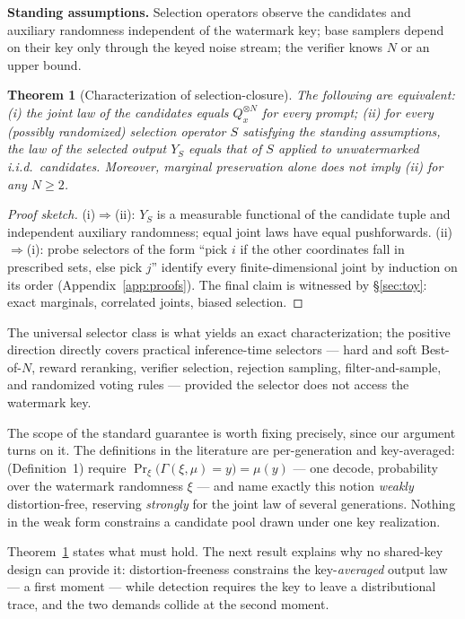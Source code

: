 \documentclass{article} %
\newtheorem{theorem}{Theorem}
\begin{document}
\textbf{Standing assumptions.} Selection operators observe the candidates and
auxiliary randomness independent of the watermark key; base samplers depend on
their key only through the keyed noise stream; the verifier knows $N$ or an
upper bound.

\begin{theorem}[Characterization of selection-closure]\label{thm:closure}
The following are equivalent:
(i) the joint law of the candidates equals $Q_x^{\otimes N}$ for every prompt;
(ii) for \emph{every} (possibly randomized) selection operator $S$ satisfying
the standing assumptions, the law of the selected output $Y_S$ equals that of
$S$ applied to unwatermarked i.i.d.\ candidates.
Moreover, marginal preservation alone does not imply (ii) for any $N\ge2$.
\end{theorem}
\begin{proof}[Proof sketch]
(i)$\Rightarrow$(ii): $Y_S$ is a measurable functional of the candidate tuple
and independent auxiliary randomness; equal joint laws have equal pushforwards.
(ii)$\Rightarrow$(i): probe selectors of the form ``pick $i$ if the other
coordinates fall in prescribed sets, else pick $j$'' identify every
finite-dimensional joint by induction on its order (Appendix~\ref{app:proofs}).
The final claim is witnessed by \S\ref{sec:toy}: exact marginals, correlated
joints, biased selection.
\end{proof}

The universal selector class is what yields an exact characterization; the
positive direction directly covers practical inference-time selectors ---
hard and soft Best-of-$N$, reward reranking, verifier selection, rejection
sampling, filter-and-sample, and randomized voting rules --- provided the
selector does not access the watermark key.

The scope of the standard guarantee is worth fixing precisely, since our
argument turns on it. The definitions in the literature are per-generation
and key-averaged: \citet{kuditipudi2023robust} (Definition~1) require
$\Pr_\xi\big(\Gamma(\xi,\mu)=y\big)=\mu(y)$ --- one decode,
probability over the watermark randomness $\xi$ --- and
\citet{keycollision2024} name exactly this notion \emph{weakly}
distortion-free, reserving \emph{strongly} for the joint law of several
generations. Nothing in the weak form constrains a candidate pool drawn
under one key realization.

Theorem~\ref{thm:closure} states what must hold. The next result explains
why no shared-key design can provide it: distortion-freeness constrains the
key-\emph{averaged} output law --- a first moment --- while detection
requires the key to leave a distributional trace, and the two demands collide
at the second moment.
\end{document}
